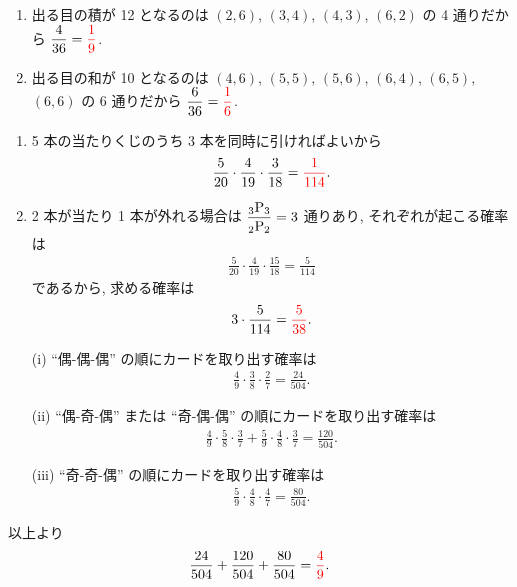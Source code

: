 \begin{enumerate}
	\item{
		出る目の積が 12 となるのは $(2, 6)$, $(3, 4)$, $(4, 3)$, $(6, 2)$ の 4 通りだから $\dfrac{4}{36} = \textcolor{red}{\dfrac{1}{9}}$.
	}
	\item{
		出る目の和が 10 となるのは $(4, 6)$, $(5, 5)$, $(5, 6)$, $(6, 4)$, $(6, 5)$, $(6, 6)$ の 6 通りだから $\dfrac{6}{36} = \textcolor{red}{\dfrac{1}{6}}$.
	}
\end{enumerate}

\begin{enumerate}
	\item{
		5 本の当たりくじのうち 3 本を同時に引ければよいから
		\begin{align}
			\frac{5}{20}\cdot\frac{4}{19}\cdot\frac{3}{18} = \textcolor{red}{\frac{1}{114}}.
		\end{align}
	}
	\item{
		2 本が当たり 1 本が外れる場合は $\dfrac{{{}_{3}\mathrm{P}_{3}}}{{{}_{2}\mathrm{P}_{2}}} = 3$ 通りあり, それぞれが起こる確率は
		\begin{align}
			\frac{5}{20}\cdot\frac{4}{19}\cdot\frac{15}{18} = \frac{5}{114}
		\end{align}
		であるから, 求める確率は
		\begin{align}
			3\cdot\frac{5}{114} = \textcolor{red}{\frac{5}{38}}.
		\end{align}
	}
\end{enumerate}

\begin{enumerate}
	\item[(i)]{
		``偶-偶-偶'' の順にカードを取り出す確率は
		\begin{align}
			\frac{4}{9}\cdot\frac{3}{8}\cdot\frac{2}{7} = \frac{24}{504}.
		\end{align}
	}
	\item[(ii)]{
		``偶-奇-偶'' または ``奇-偶-偶'' の順にカードを取り出す確率は
		\begin{align}
			\frac{4}{9}\cdot\frac{5}{8}\cdot\frac{3}{7} + \frac{5}{9}\cdot\frac{4}{8}\cdot\frac{3}{7} = \frac{120}{504}.
		\end{align}
	}
	\item[(iii)]{
		``奇-奇-偶'' の順にカードを取り出す確率は
		\begin{align}
			\frac{5}{9}\cdot\frac{4}{8}\cdot\frac{4}{7} = \frac{80}{504}.
		\end{align}
	}
\end{enumerate}
以上より
\begin{align}
	\frac{24}{504} + \frac{120}{504} + \frac{80}{504} = \textcolor{red}{\frac{4}{9}}.
\end{align}

